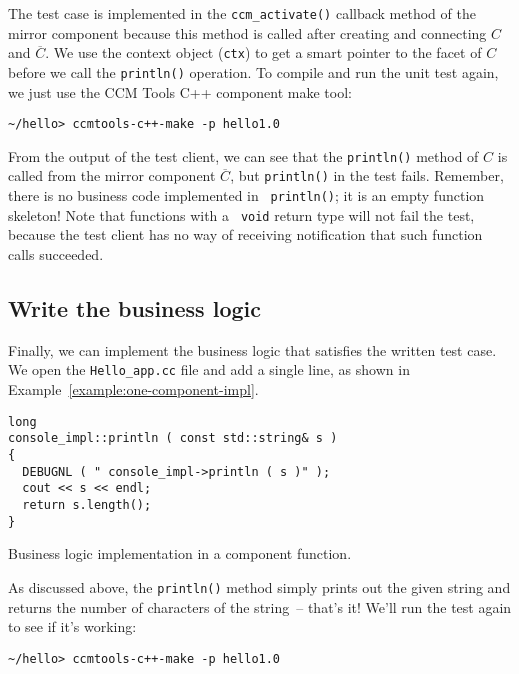 The test case is implemented in the {\tt ccm\_activate()} callback method of the
mirror component because this method is called after creating and connecting $C$
and $\overline{C}$. We use the context object ({\tt ctx}) to get a smart pointer
to the facet of $C$ before we call the {\tt println()} operation. To compile and
run the unit test again, we just use the CCM Tools C++ component make tool:
\begin{small}
\begin{verbatim}
~/hello> ccmtools-c++-make -p hello1.0
\end{verbatim}
\end{small}

From the output of the test client, we can see that the {\tt println()} method
of $C$ is called from the mirror component $\overline{C}$, but {\tt println()}
in the test fails. Remember, there is no business code implemented in {\tt
println()}; it is an empty function skeleton! Note that functions with a {\tt
void} return type will not fail the test, because the test client has no way of
receiving notification that such function calls succeeded.

\subsection{Write the business logic}

Finally, we can implement the business logic that satisfies the written test
case. We open the {\tt Hello\_app.cc} file and add a single line, as shown in
Example~\ref{example:one-component-impl}.

\begin{Example}
\begin{minifbox}
\begin{small}
\begin{verbatim}
long
console_impl::println ( const std::string& s )
{
  DEBUGNL ( " console_impl->println ( s )" );
  cout << s << endl;
  return s.length();
}
\end{verbatim}
\end{small}
\end{minifbox}
\caption{Business logic implementation in a component function.}
\label{example:one-component-impl}
\end{Example}

As discussed above, the {\tt println()} method simply prints out the given
string and returns the number of characters of the string~-- that's it! We'll
run the test again to see if it's working:
\begin{small}
\begin{verbatim}
~/hello> ccmtools-c++-make -p hello1.0
\end{verbatim}
\end{small}


